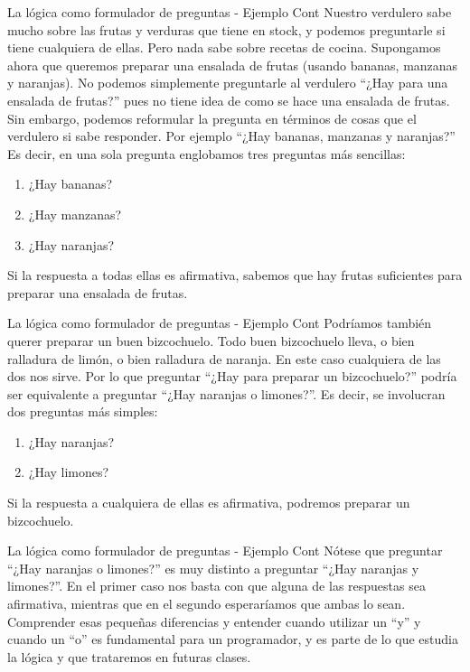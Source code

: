 \begin{frame}{La lógica como formulador de preguntas - Ejemplo Cont}
  Nuestro verdulero sabe mucho sobre las frutas y verduras que tiene en stock,
  y podemos preguntarle si tiene cualquiera de ellas. Pero nada sabe sobre
  recetas de cocina.
  \jump
  Supongamos ahora que queremos preparar una ensalada de frutas (usando bananas,
  manzanas y naranjas). No podemos simplemente preguntarle al verdulero
  ``¿Hay para una ensalada de frutas?'' pues no tiene idea de como se hace
  una ensalada de frutas.
  \jump
  Sin embargo, podemos reformular la pregunta en términos de cosas que el
  verdulero si sabe responder. Por ejemplo ``¿Hay bananas, manzanas y naranjas?''
  Es decir, en una sola pregunta englobamos tres preguntas más sencillas:
  \begin{enumerate}
    \item ¿Hay bananas?
    \item ¿Hay manzanas?
    \item ¿Hay naranjas?
  \end{enumerate}
  \jump
  Si la respuesta a todas ellas es afirmativa, sabemos que hay frutas suficientes
  para preparar una ensalada de frutas.
\end{frame}


\begin{frame}{La lógica como formulador de preguntas - Ejemplo Cont}
  Podríamos también querer preparar un buen bizcochuelo. Todo buen bizcochuelo
  lleva, o bien ralladura de limón, o bien ralladura de naranja.
  \jump
  En este caso cualquiera de las dos nos sirve. Por lo que preguntar
  ``¿Hay para preparar un bizcochuelo?'' podría ser equivalente a preguntar
  ``¿Hay naranjas o limones?''.
  \jump
  Es decir, se involucran dos preguntas más simples: 
  \begin{enumerate}    
    \item ¿Hay naranjas?
    \item ¿Hay limones?
  \end{enumerate}
  \jump
  Si la respuesta a cualquiera de ellas es afirmativa, podremos preparar un
  bizcochuelo.
\end{frame}


\begin{frame}{La lógica como formulador de preguntas - Ejemplo Cont}
  Nótese que preguntar ``¿Hay naranjas o limones?'' es muy distinto a
  preguntar ``¿Hay naranjas y limones?''. En el primer caso nos basta con
  que alguna de las respuestas sea afirmativa, mientras que en el segundo
  esperaríamos que ambas lo sean.
  \jump
  Comprender esas pequeñas diferencias y entender cuando utilizar un ``y'' y
  cuando un ``o'' es fundamental para un programador, y es parte de lo que
  estudia la lógica y que trataremos en futuras clases.
\end{frame}